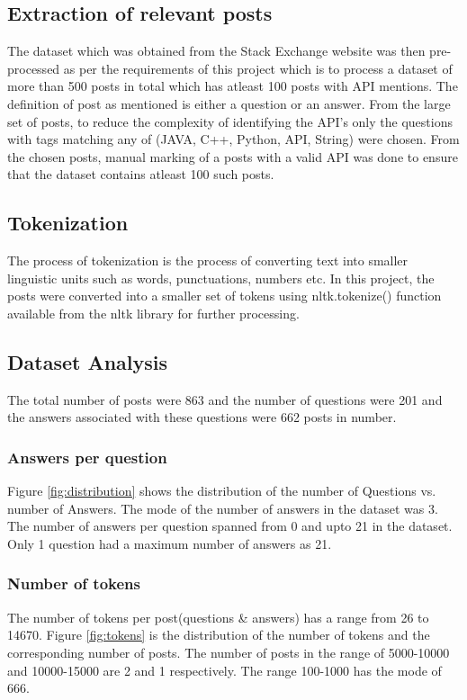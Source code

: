 \documentclass{sig-alternate-05-2015}
\begin{document}
\subsection{Extraction of relevant posts}
The dataset which was obtained from the Stack Exchange website was then pre-processed as per the requirements of this project which is to process a dataset of more than 500 posts in total which has atleast 100 posts with API mentions. The definition of post as mentioned is either a question or an answer. From the large set of posts, to reduce the complexity of identifying the API's only the questions with tags matching any of (JAVA, C++, Python, API, String) were chosen. From the chosen posts, manual marking of a posts with a valid API was done to ensure that the dataset contains atleast 100 such posts.

\subsection{Tokenization}
The process of tokenization is the process of converting text into smaller linguistic units such as words, punctuations, numbers etc. In this project, the posts were converted into a smaller set of tokens using nltk.tokenize() function available from the nltk library\cite{bird2006nltk} for further processing.

\subsection{Dataset Analysis}
The total number of posts were 863 and the number of questions were 201 and the answers associated with these questions were 662 posts in number.
\subsubsection{Answers per question}
Figure \ref{fig:distribution} shows the distribution of the number of Questions vs. number of Answers. The mode of the number of answers in the dataset was 3. The number of answers per question spanned from 0 and upto 21 in the dataset. Only 1 question had a maximum number of answers as 21.

\subsubsection{Number of tokens}
The number of tokens per post(questions \& answers) has a range from 26 to 14670. Figure \ref{fig:tokens} is the distribution of the number of tokens and the corresponding number of posts. The number of posts in the range of 5000-10000 and 10000-15000 are 2 and 1 respectively. The range 100-1000 has the mode of 666.
\end{document}
